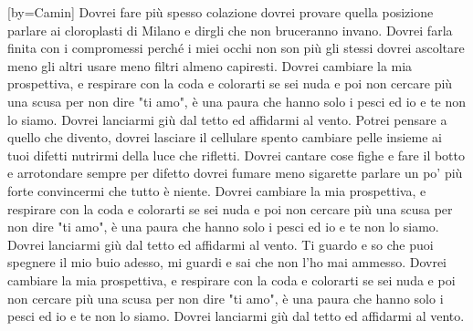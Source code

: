 [by={Camin}]
\chordsoff
\beginverse
Dovrei fare più spesso colazione 
dovrei provare quella posizione 
parlare ai cloroplasti di Milano 
e dirgli che non bruceranno invano. 
\endverse
\beginverse*
Dovrei farla finita con i compromessi 
perché i miei occhi non son più gli stessi 
dovrei ascoltare meno gli altri 
usare meno filtri 
almeno capiresti. 
\endverse
\beginchorus
Dovrei cambiare la mia prospettiva, 
e respirare con la coda 
e colorarti se sei nuda e poi 
non cercare più una scusa per non dire "ti amo", 
è una paura che hanno solo i pesci 
ed io e te non lo siamo. 
Dovrei lanciarmi giù dal tetto 
ed affidarmi al vento. 
\endchorus
\beginverse
Potrei pensare a quello che divento, 
dovrei lasciare il cellulare spento 
cambiare pelle insieme ai tuoi difetti 
nutrirmi della luce che rifletti. 
\endverse
\beginverse*
Dovrei cantare cose fighe e fare il botto 
e arrotondare sempre per difetto 
dovrei fumare meno sigarette 
parlare un po' più forte 
convincermi che tutto è niente. 
\endverse
\beginchorus
Dovrei cambiare la mia prospettiva, 
e respirare con la coda 
e colorarti se sei nuda e poi 
non cercare più una scusa per non dire "ti amo", 
è una paura che hanno solo i pesci 
ed io e te non lo siamo. 
Dovrei lanciarmi giù dal tetto 
ed affidarmi al vento. 
\endchorus
\beginverse*
Ti guardo e so che puoi spegnere il mio buio adesso, 
mi guardi e sai che non l'ho mai ammesso.
\endverse
\beginchorus
Dovrei cambiare la mia prospettiva, 
e respirare con la coda 
e colorarti se sei nuda e poi 
non cercare più una scusa per non dire "ti amo", 
è una paura che hanno solo i pesci 
ed io e te non lo siamo. 
Dovrei lanciarmi giù dal tetto 
ed affidarmi al vento. 
\endchorus
\endsong

